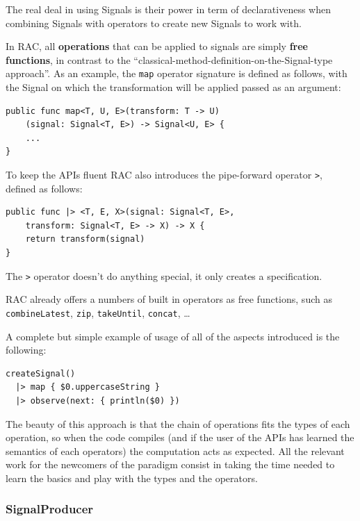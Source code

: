 The real deal in using Signals is their power in term of declarativeness
when combining Signals with operators to create new Signals to work
with.

In RAC, all \textbf{operations} that can be applied to signals are
simply \textbf{free functions}, in contrast to the
``classical-method-definition-on-the-Signal-type approach''. As an
example, the \texttt{map} operator signature is defined as follows, with
the Signal on which the transformation will be applied passed as an
argument:

\begin{verbatim}
public func map<T, U, E>(transform: T -> U)
    (signal: Signal<T, E>) -> Signal<U, E> {
    ...
}
\end{verbatim}

To keep the APIs fluent RAC also introduces the pipe-forward operator
\texttt{\textbar{}\textgreater{}}, defined as follows:

\begin{verbatim}
public func |> <T, E, X>(signal: Signal<T, E>,
    transform: Signal<T, E> -> X) -> X {
    return transform(signal)
}
\end{verbatim}

The \texttt{\textbar{}\textgreater{}} operator doesn't do anything
special, it only creates a specification.

RAC already offers a numbers of built in operators as free functions,
such as \texttt{combineLatest}, \texttt{zip}, \texttt{takeUntil},
\texttt{concat}, \ldots{}

A complete but simple example of usage of all of the aspects introduced
is the following:

\begin{verbatim}
createSignal()
  |> map { $0.uppercaseString }
  |> observe(next: { println($0) })
\end{verbatim}

The beauty of this approach is that the chain of operations fits the
types of each operation, so when the code compiles (and if the user of
the APIs has learned the semantics of each operators) the computation
acts as expected. All the relevant work for the newcomers of the
paradigm consist in taking the time needed to learn the basics and play
with the types and the operators.

\subsubsection{SignalProducer}\label{signalproducer}

